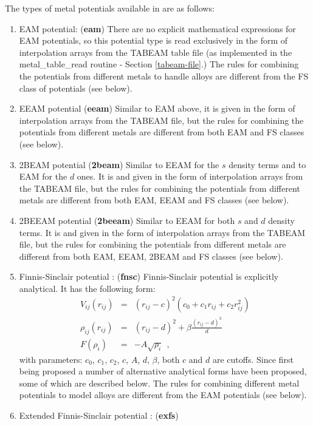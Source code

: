 The types of metal potentials available in \D are as follows:
\begin{enumerate}
\item EAM potential:  ({\bf eam})
There are no explicit mathematical expressions for EAM potentials, so
this potential type is read exclusively in the form of interpolation
arrays from the TABEAM table file (as implemented in the {\sc
metal\_table\_read} routine - Section \ref{tabeam-file}.)  The rules
for combining the potentials from different metals to handle alloys
are different from the FS class of potentials (see below).
\item EEAM potential ({\bf eeam})
Similar to EAM above, it is given in the form of interpolation arrays
from the TABEAM file, but the rules for combining the potentials from
different metals are different from both EAM and FS classes (see below).
\item 2BEAM potential ({\bf 2beam})
Similar to EEAM for the $s$ density terms and to EAM for the $d$ ones.
It is and given in the form of interpolation arrays from the TABEAM file,
but the rules for combining the potentials from different metals are
different from both EAM, EEAM and FS classes (see below).
\item 2BEEAM potential ({\bf 2beeam})
Similar to EEAM for both $s$ and $d$ density terms. It is and given in
the form of interpolation arrays from the TABEAM file, but the rules for
combining the potentials from different metals are
different from both EAM, EEAM, 2BEAM and FS classes (see below).
\item Finnis-Sinclair potential \cite{finnis-84a}:  ({\bf fnsc})
Finnis-Sinclair potential is explicitly analytical.  It has the following form:
\begin{eqnarray}
V_{ij}(r_{ij}) &=& (r_{ij}-c)^{2} (c_{0}+c_{1}r_{ij}+c_{2}r_{ij}^{2}) \nonumber \\
\rho_{ij}(r_{ij}) &=& (r_{ij}-d)^{2} + \beta \frac{(r_{ij}-d)^{3}}{d} \\
F(\rho_{i}) &=& -A \sqrt{\rho_{i}}~~, \nonumber
\end{eqnarray}
with parameters: $c_{0}$, $c_{1}$, $c_{2}$, $c$, $A$, $d$, $\beta$,
both $c$ and $d$ are cutoffs.  Since first being proposed a number of
alternative analytical forms have been proposed, some of which are
described below.  The rules for combining different metal potentials to
model alloys are different from the EAM potentials (see below).
\item Extended Finnis-Sinclair potential \cite{dai-06a}:  ({\bf exfs})

\end{enumerate}
